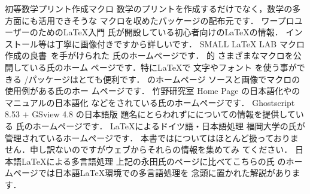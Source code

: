 \begin{urllist}
%
     {\small 初等}数学プリント作成{\small マクロ}
     \sanko \webEmath
     \sanko 数学のプリントを作成するだけでなく，数学の多方面にも活用できそうな
     マクロを収めたパッケージの配布元です．
%
     ワープロユーザーのための{\LaTeX}入門
     \sanko \webOtomo
     \sanko {}氏が開設している初心者向けの{\LaTeX}の情報．
     インストール等は丁寧に画像付きですから詳しいです．
%
     SMALL {\LaTeX} LAB
     \sanko \webYoshinaga
     \sanko マクロ作成の良書~\cite{macroclass1,macroclass2}を手がけられた
     氏のホームページです．
%
     {\LaTeXe}的
     \sanko \webSaito
     \sanko さまざまなマクロを公開している氏のホーム
     ページです．特に\LaTeX で 文字やフォント
     を使う事ができる /パッケージはとても便利です．
%
     のホームページ
     \sanko \webKumazawa
     \sanko ソースと画像でマクロの使用例がある氏のホー
     ムページです．
%
     竹野研究室 Home Page
     \sanko \webTakeno
     \sanko {}の日本語化やのマニュアルの日本語化
     などをされている氏のホームページです．
%
      Ghostscript 8.53 $+$ GSview 4.8 の日本語版
     \sanko \webHotta
     \sanko 題名にとらわれずに{\pLaTeXe}についての情報を提供している
     氏のホームページです．
%
     {\LaTeX}によるドイツ語・日本語処理
     \sanko \webNagata
     \sanko
     福岡大学の氏が管理されているホームページです．
     本書ではについてはほとんど扱っておりま
     せん．申し訳ないのですがウェブからそれらの情報を集めてみ
     てください．%
%
     日本語{\LaTeX}による多言語処理
     \sanko \webInagaki
     \sanko 上記の永田氏のページに比べてこちらの氏
     のホームページでは日本語{\LaTeX}環境での多言語処理を
     念頭に置かれた解説があります．
%
\end{urllist}


\endinput
